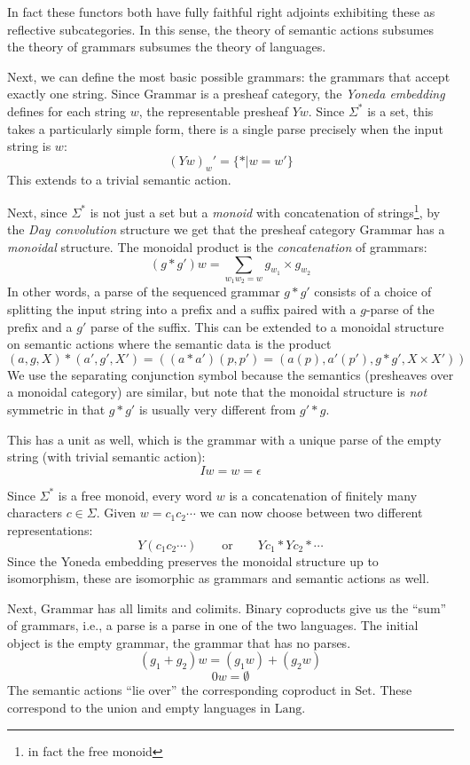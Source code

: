 \documentclass[12pt]{article}
\newcommand{\Set}{\textrm{Set}}
\newcommand{\Lang}{\textrm{Lang}}
\newcommand{\Grammar}{\textrm{Grammar}}
\newcommand\sepconj{\mathbin{*}}
\begin{document}
In fact these functors both have fully faithful right adjoints
exhibiting these as reflective subcategories. In this sense, the
theory of semantic actions subsumes the theory of grammars subsumes
the theory of languages.

Next, we can define the most basic possible grammars: the grammars
that accept exactly one string.
%
Since $\Grammar$ is a presheaf category, the \emph{Yoneda embedding}
defines for each string $w$, the representable presheaf $Y w$. Since
$\Sigma^*$ is a set, this takes a particularly simple form, there is a
single parse precisely when the input string is $w$:
\[ (Y w)_w' = \{ * | w = w' \} \]
%
This extends to a trivial semantic action.

Next, since $\Sigma^*$ is not just a set but a \emph{monoid} with
concatenation of strings\footnote{in fact the free monoid}, by the
\emph{Day convolution} structure we get that the presheaf category
$\Grammar$ has a \emph{monoidal} structure. The monoidal product is
the \emph{concatenation} of grammars:
\[ (g \sepconj g')w = \sum_{w_1w_2 = w} g_{w_1} \times g_{w_2}\]
In other words, a parse of the sequenced grammar $g \sepconj g'$
consists of a choice of splitting the input string into a prefix and a
suffix paired with a $g$-parse of the prefix and a $g'$ parse of the
suffix. This can be extended to a monoidal structure on semantic
actions where the semantic data is the product
\[ (a, g, X) \sepconj (a', g', X') = ((a\sepconj a')(p,p') = (a(p), a'(p'), g \sepconj g', X \times X'))\]
We use the separating conjunction symbol because the semantics
(presheaves over a monoidal category) are similar, but note that the
monoidal structure is \emph{not} symmetric in that $g \sepconj g'$ is
usually very different from $g' \sepconj g$.

This has a unit as well, which is the grammar with a unique parse of
the empty string (with trivial semantic action):
\[ I w = w = \epsilon \]

Since $\Sigma^*$ is a free monoid, every word $w$ is a concatenation
of finitely many characters $c \in \Sigma$. Given $w = c_1c_2\cdots$
we can now choose between two different representations:
\[ Y(c_1c_2\cdots) \qquad \textrm{or} \qquad Yc_1 \sepconj Yc_2 \sepconj \cdots\]
Since the Yoneda embedding preserves the monoidal structure up to
isomorphism, these are isomorphic as grammars and semantic actions as
well.

Next, $\Grammar$ has all limits and colimits. Binary coproducts give
us the ``sum'' of grammars, i.e., a parse is a parse in one of the two
languages. The initial object is the empty grammar, the grammar that
has no parses.
\[ (g_1 + g_2) w = (g_1 w) + (g_2 w) \]
\[ 0 w = \emptyset \]
The semantic actions ``lie over'' the corresponding coproduct in
$\Set$. These correspond to the union and empty languages in $\Lang$.
\end{document}
